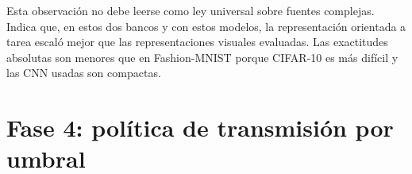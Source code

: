 Esta observaci\'on no debe leerse como ley universal sobre fuentes complejas. Indica que, en estos dos bancos y con estos modelos, la representaci\'on orientada a tarea escal\'o mejor que las representaciones visuales evaluadas. Las exactitudes absolutas son menores que en Fashion-MNIST porque CIFAR-10 es m\'as dif\'icil y las CNN usadas son compactas.

\section{Fase 4: pol\'itica de transmisi\'on por umbral}

